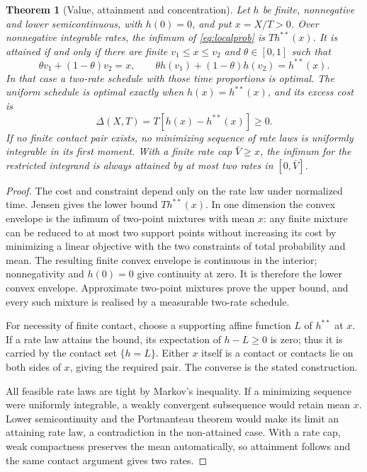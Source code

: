 \documentclass[11pt]{article}
\numberwithin{equation}{section}
\newtheorem{theorem}{Theorem}[section]
\theoremstyle{definition}
\theoremstyle{remark}
\theoremstyle{definition}
\begin{document}
\begin{theorem}[Value, attainment and concentration]\label{thm:relaxation}
Let $h$ be finite, nonnegative and lower semicontinuous, with $h(0)=0$,
and put $x=X/T>0$. Over nonnegative integrable rates, the infimum of
\eqref{eq:localprob} is $Th^{**}(x)$. It is attained if and only if there
are finite $v_1\le x\le v_2$ and $\theta\in[0,1]$ such that
\[
 \theta v_1+(1-\theta)v_2=x,\qquad
 \theta h(v_1)+(1-\theta)h(v_2)=h^{**}(x).
\]
In that case a two-rate schedule with those time proportions is optimal.
The uniform schedule is optimal exactly when $h(x)=h^{**}(x)$, and its
excess cost is
\begin{equation}\label{eq:gap}
 \Delta(X,T)=T[h(x)-h^{**}(x)]\ge0.
\end{equation}
If no finite contact pair exists, no minimizing sequence of rate laws is
uniformly integrable in its first moment. With a finite rate cap
$\bar V\ge x$, the infimum for the restricted integrand is always attained
by at most two rates in $[0,\bar V]$.
\end{theorem}
\begin{proof}
The cost and constraint depend only on the rate law under normalized time.
Jensen gives the lower bound $Th^{**}(x)$. In one dimension the convex
envelope is the infimum of two-point mixtures with mean $x$: any finite
mixture can be reduced to at most two support points without increasing its
cost by minimizing a linear objective with the two constraints of total
probability and mean. The resulting finite convex envelope is continuous in
the interior; nonnegativity and $h(0)=0$ give continuity at zero. It is
therefore the lower convex envelope. Approximate two-point mixtures prove the
upper bound, and every such mixture is realised by a measurable two-rate
schedule.

For necessity of finite contact, choose a supporting affine function $L$ of
$h^{**}$ at $x$. If a rate law attains the bound, its expectation of
$h-L\ge0$ is zero; thus it is carried by the contact set $\{h=L\}$.
Either $x$ itself is a contact or contacts lie on both sides of $x$, giving
the required pair. The converse is the stated construction.

All feasible rate laws are tight by Markov's inequality. If a minimizing
sequence were uniformly integrable, a weakly convergent subsequence would
retain mean $x$. Lower semicontinuity and the Portmanteau theorem would make
its limit an attaining rate law, a contradiction in the non-attained case.
With a rate cap, weak compactness preserves the mean automatically, so
attainment follows and the same contact argument gives two rates.
\end{proof}
\end{document}
